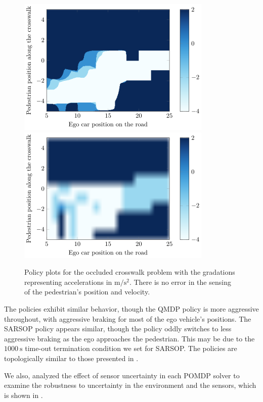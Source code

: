 \documentclass[conference]{IEEEtran}
\begin{document}
\begin{figure}[tbph]
    \centerline{
        \includegraphics[width=0.5\linewidth]{src/plots/qmdp_0_00001_noise_0_01.png}
        \includegraphics[width=0.5\linewidth]{src/plots/sarsop_0_01_1000_noise_0_01.png}
    }
    \caption{Policy plots for the occluded crosswalk problem with the gradations representing accelerations in $\si{\meter\per\square\second}$. There is no error in the sensing of the pedestrian's position and velocity.}
    \label{fig:qmdp_sarsop_1}
\end{figure}

The policies exhibit similar behavior, though the QMDP policy is more aggressive throughout, with aggressive braking for most of the ego vehicle's positions. The SARSOP policy appears similar, though the policy oddly switches to less aggressive braking as the ego approaches the pedestrian. This may be due to the $1000 ~\si{\second}$ time-out termination condition we set for SARSOP. The policies are topologically similar to those presented in \cite{Bouton2018ScalableDriving}.

We also, analyzed the effect of sensor uncertainty in each POMDP solver to examine the robustness to uncertainty in the environment and the sensors, which is shown in .
\end{document}
